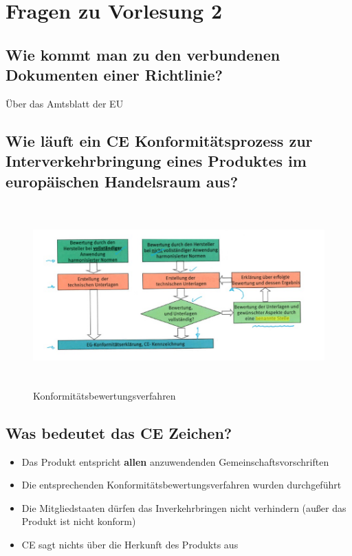 \section{Fragen zu Vorlesung 2}
\subsection{Wie kommt man zu den verbundenen Dokumenten einer Richtlinie?}
Über das Amtsblatt der EU

\subsection{Wie läuft ein CE Konformitätsprozess zur Interverkehrbringung eines Produktes im europäischen Handelsraum aus?}

\begin{figure}[ht]
  \centering
  \includegraphics[height=7cm]{src/assets/pictures/lv2_konformitaetsprozess.jpg}
  \caption{Konformitätsbewertungsverfahren}
\end{figure}

\subsection{Was bedeutet das CE Zeichen?}
\begin{itemize}
  \item Das Produkt entspricht \textbf{allen} anzuwendenden Gemeinschaftsvorschriften
  \item Die entsprechenden Konformitätsbewertungsverfahren wurden durchgeführt
  \item Die Mitgliedstaaten dürfen das Inverkehrbringen nicht verhindern (außer das Produkt ist nicht konform)
  \item CE sagt nichts über die Herkunft des Produkts aus
\end{itemize}

